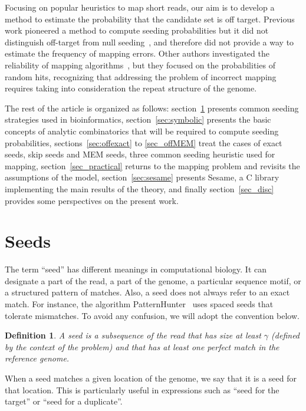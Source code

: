 \documentclass{article}
\newtheorem{definition}{Definition}
\begin{document}
Focusing on popular heuristics to map short reads, our aim is to develop a
method to estimate the probability that the candidate set is off target.
Previous work pioneered a method to compute seeding probabilities but it
did not distinguish off-target from null
seeding~\cite{filion2017analytic,filion2018analytic}, and therefore did
not provide a way to estimate the frequency of mapping errors. Other
authors investigated the reliability of mapping
algorithms~\cite{pmid23872968}, but they focused on the probabilities of
random hits, recognizing that addressing the problem of incorrect mapping
requires taking into consideration the repeat structure of the genome.

The rest of the article is organized as follows: section~\ref{sec_seeds}
presents common seeding strategies used in bioinformatics,
section~\ref{sec:symbolic} presents the basic concepts of analytic
combinatorics that will be required to compute seeding probabilities,
sections~\ref{sec:offexact} to \ref{sec_offMEM} treat the cases of exact
seeds, skip seeds and MEM seeds, three common seeding heuristic used for
mapping, section~\ref{sec_practical} returns to the mapping problem and
revisits the assumptions of the model, section~\ref{sec:sesame} presents
Sesame, a C library implementing the main results of the theory, and
finally section~\ref{sec_disc} provides some perspectives on the present
work.


\section{Seeds}
\label{sec_seeds}

The term ``seed'' has different meanings in computational biology. It can
designate a part of the read, a part of the genome, a particular sequence
motif, or a structured pattern of matches. Also, a seed does not always
refer to an exact match. For instance, the algorithm
PatternHunter~\cite{pmid11934743} uses spaced seeds that tolerate
mismatches. To avoid any confusion, we will adopt the convention below.

\begin{definition}
A seed is a subsequence of the read that has size at least $\gamma$
(defined by the context of the problem) and that has at least one perfect
match in the reference genome.
\end{definition}

When a seed matches a given location of the genome, we say that it is a
seed for that location. This is particularly useful in expressions such as
``seed for the target'' or ``seed for a duplicate''.
\end{document}

